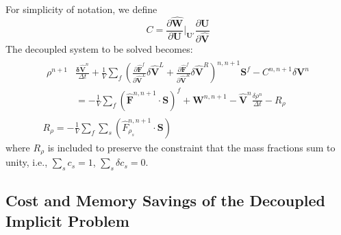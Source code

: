 %
For simplicity of notation, we define
%
\begin{equation} C = \frac{\partial \mathbf{\hat{W}}}{\partial
    \mathbf{U}}\bigg|_{\mathbf{U}'} \frac{\partial \mathbf{U}}{\partial
      \mathbf{\hat{V}}} \end{equation}
%
The decoupled system to be solved becomes:
%
\begin{gather} \begin{split} \rho^{n+1}&\frac{\mathbf{\delta \hat{V}}^n}{\Delta
    t}+\frac{1}{V}\sum\limits_{f}(\frac{\partial \mathbf{\hat{F}}^f}{\partial
      \mathbf{\hat{V}}^L}\delta 	\mathbf{\hat{V}}^L +\frac{\partial
        \mathbf{\hat{F}}^f}{\partial \mathbf{\hat{V}}^R}\delta
        \mathbf{\hat{V}}^R)^{n, n+1}\mathbf{S}^f - C^{n, n+1}\delta\mathbf{V}^n
        \\ &=
        -\frac{1}{V}\sum\limits_{f}(\mathbf{\hat{F}}^{n,n+1}\cdot\mathbf{S})^f +
        \mathbf{W}^{n, n+1} -\mathbf{\hat{V}}^n\frac{\delta \rho^n}{\Delta t} -
        R_\rho \end{split} \\ R_\rho =
      -\frac{1}{V}\sum\limits_{f}{\sum\limits_{s}{(\hat{F}_{\rho_s}^{n,n+1}\cdot\mathbf{S})}}
    \end{gather}
%
where $R_\rho$ is included to preserve the constraint that the mass fractions
sum to unity, i.e., $\sum\limits_{s}{c_s}=1$, $\sum\limits_{s}{\delta
c_s}=0$.

\subsection{Cost and Memory Savings of the Decoupled Implicit Problem}

